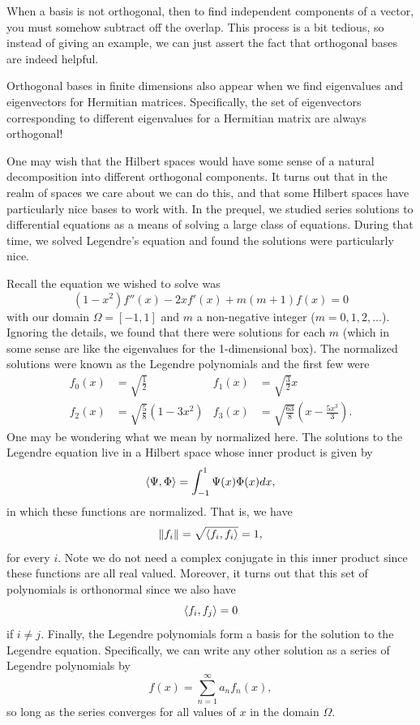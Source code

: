 When a basis is not orthogonal, then to find independent components of a vector, you must somehow subtract off the overlap. This process is a bit tedious, so instead of giving an example, we can just assert the fact that orthogonal bases are indeed helpful. 

\begin{remark}
	Orthogonal bases in finite dimensions also appear when we find eigenvalues and eigenvectors for Hermitian matrices. Specifically, the set of eigenvectors corresponding to different eigenvalues for a Hermitian matrix are always orthogonal!
\end{remark}

One may wish that the Hilbert spaces would have some sense of a natural decomposition into different orthogonal components.  It turns out that in the realm of spaces we care about we can do this, and that some Hilbert spaces have particularly nice bases to work with. In the prequel, we studied series solutions to differential equations as a means of solving a large class of equations. During that time, we solved Legendre's equation and found the solutions were particularly nice.

Recall the equation we wished to solve was
\[
(1-x^2)f''(x)-2xf'(x)+m(m+1)f(x)=0
\]
with our domain $\Omega=[-1,1]$ and $m$ a non-negative integer ($m=0,1,2,\dots$). Ignoring the details, we found that there were solutions for each $m$ (which in some sense are like the eigenvalues for the 1-dimensional box).  The normalized solutions were known as the Legendre polynomials and the first few were
\begin{align*}
	f_0(x)&=\sqrt{\frac{1}{2}} & f_1(x)&=\sqrt{\frac{3}{2}} x\\
	f_2(x)&= \sqrt{\frac{5}{8}} (1-3x^2) & f_3(x)&=\sqrt{\frac{63}{8}}\left(x-\frac{5x^3}{3}\right).
\end{align*}
One may be wondering what we mean by normalized here. The solutions to the Legendre equation live in a Hilbert space whose inner product is given by
\[
\left\langle \Psi, \Phi \right\rangle = \int_{-1}^1 \Psi(x)\Phi(x)dx,
\]
in which these functions are normalized. That is, we have  
\[
\|f_i\|= \sqrt{\left\langle f_i, f_i \right\rangle} = 1,
\]
for every $i$. Note we do not need a complex conjugate in this inner product since these functions are all real valued. Moreover, it turns out that this set of polynomials is orthonormal since we also have
\[
\left\langle f_i, f_j \right\rangle = 0
\]
if $i\neq j$. Finally, the Legendre polynomials form a basis for the solution to the Legendre equation.  Specifically, we can write any other solution as a series of Legendre polynomials by
\[
f(x)= \sum_{n=1}^\infty a_n f_n(x),
\]
so long as the series converges for all values of $x$ in the domain $\Omega$.  


